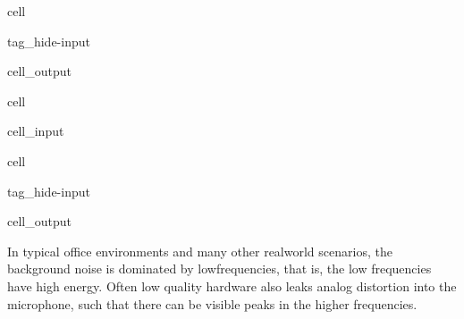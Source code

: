 \documentclass[letterpaper,10pt,english]{jupyterBook}
\begin{document}
\begin{sphinxuseclass}{cell}
\begin{sphinxuseclass}{tag_hide-input}\begin{sphinxVerbatimOutput}

\begin{sphinxuseclass}{cell_output}
\noindent{}

\end{sphinxuseclass}\end{sphinxVerbatimOutput}

\end{sphinxuseclass}
\end{sphinxuseclass}
\begin{sphinxuseclass}{cell}\begin{sphinxVerbatimInput}

\begin{sphinxuseclass}{cell_input}
\begin{sphinxVerbatim}[commandchars=\\\{\}]
  \PYG{p}{[}\PYG{p}{]}
  
\end{sphinxVerbatim}

\end{sphinxuseclass}\end{sphinxVerbatimInput}

\end{sphinxuseclass}
\begin{sphinxuseclass}{cell}
\begin{sphinxuseclass}{tag_hide-input}\begin{sphinxVerbatimOutput}

\begin{sphinxuseclass}{cell_output}
\noindent{}

\end{sphinxuseclass}\end{sphinxVerbatimOutput}

\end{sphinxuseclass}
\end{sphinxuseclass}
\sphinxAtStartPar
In typical office environments and many other real\sphinxhyphen{}world scenarios, the background noise is dominated by low\sphinxhyphen{}frequencies, that is, the low frequencies have high energy. Often low quality hardware also leaks analog distortion into the microphone, such that there can be visible peaks in the higher frequencies.
\end{document}
